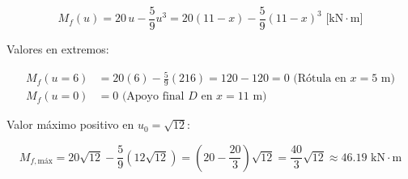 \begin{itemize}
          \begin{equation}

              \boxed{M_f(u) = 20\,u - \frac{5}{9}u^3 = 20(11 - x) - \frac{5}{9}(11 - x)^3\text{ [kN}\cdot\text{m]}}

          \end{equation}

          Valores en extremos:

          \begin{align*}

              M_f(u=6) & = 20(6) - \frac{5}{9}(216) = 120 - 120 = 0\text{ (Rótula en } x = 5\text{ m)} \\

              M_f(u=0) & = 0\text{ (Apoyo final } D\text{ en } x = 11\text{ m)}

          \end{align*}

          Valor máximo positivo en $u_0 = \sqrt{12}$:

          \begin{equation}

              M_{f,\text{máx}} = 20\sqrt{12} - \frac{5}{9}(12\sqrt{12}) = \left(20 - \frac{20}{3}\right)\sqrt{12} = \frac{40}{3}\sqrt{12} \approx \boxed{46.19\text{ kN}\cdot\text{m}}

          \end{equation}

\end{itemize}








